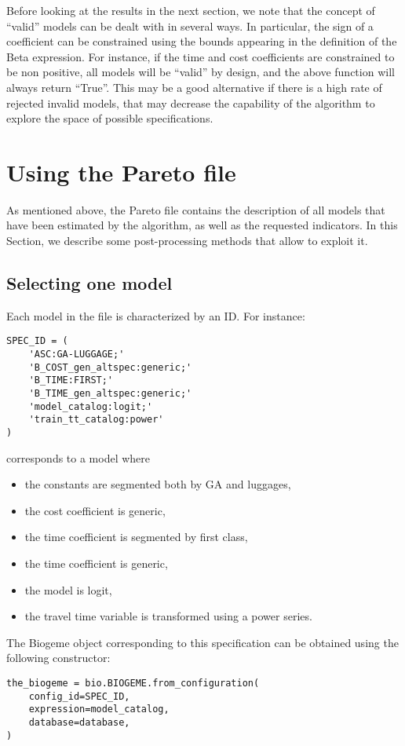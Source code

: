 \documentclass[12pt,a4paper]{article}
\begin{document}
Before looking at the results in the next section, we note that the
concept of ``valid'' models can be dealt with in several ways. In
particular, the sign of a coefficient can be constrained using the
bounds appearing in the definition of the Beta expression. For
instance, if the time and cost coefficients are constrained to be non
positive, all models will be ``valid'' by design, and the above
function will always return ``True''. This may be a good alternative if
there is a high rate of rejected invalid models, that may decrease the capability
of the algorithm to explore the space of possible specifications.


\section{Using the Pareto file}

As mentioned above, the Pareto file contains the description of all
models that have been estimated by the algorithm, as well as the
requested indicators. In this Section, we describe some
post-processing methods that allow to exploit it.

\subsection{Selecting one model}

Each model in the file is characterized by an ID. For instance:
\begin{lstlisting}
SPEC_ID = (
    'ASC:GA-LUGGAGE;'
    'B_COST_gen_altspec:generic;'
    'B_TIME:FIRST;'
    'B_TIME_gen_altspec:generic;'
    'model_catalog:logit;'
    'train_tt_catalog:power'
)
\end{lstlisting}
corresponds to a model where
\begin{itemize}
\item the constants are segmented both by GA and luggages,
\item the cost coefficient is generic,
\item the time coefficient is segmented by first class,
\item the time coefficient is generic,
\item the model is logit,
  \item the travel time variable is transformed using a power series.
\end{itemize}

The Biogeme object corresponding to this specification can be obtained using the following constructor:
\begin{lstlisting}
the_biogeme = bio.BIOGEME.from_configuration(
    config_id=SPEC_ID,
    expression=model_catalog,
    database=database,
)
\end{lstlisting}
\end{document}
